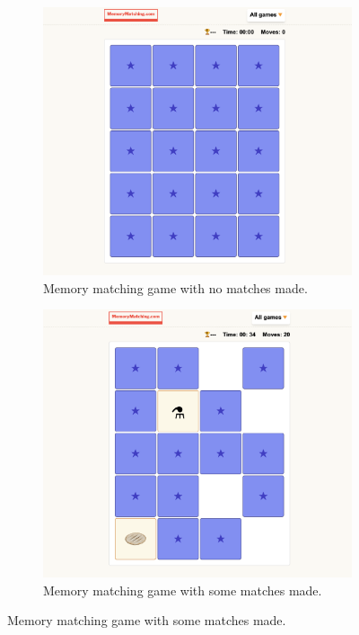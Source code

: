 \documentclass{l4proj}
\begin{document}



\begin{figure}[h]
  \centering
  \begin{subfigure}[b]{0.45\textwidth}
    \includegraphics[width=\textwidth]{dissertation/images/card_flip_before.png}
    \caption{Memory matching game with no matches made.}
    \label{fig:mem_match_unmatched}
  \end{subfigure}
  \hfill 
  \begin{subfigure}[b]{0.45\textwidth}
    \includegraphics[width=\textwidth]{dissertation/images/card_flip_during.png}
    \caption{Memory matching game with some matches made.}
    \label{fig:mem_match_matched}
  \end{subfigure}


\end{figure}
\end{document}
